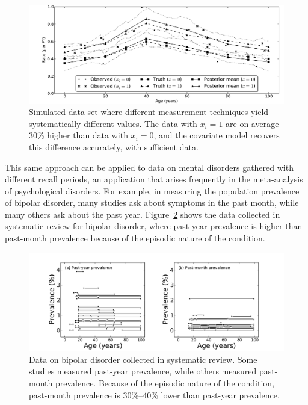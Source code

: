 \begin{figure}[h]
\begin{center}
\includegraphics[width=\textwidth]{cov_fe.pdf}
\caption[Simulated data set where different measurement techniques
  yield systematically different values.]{Simulated data set where 
  different measurement techniques
  yield systematically different values. The data with $x_i=1$ are on
  average 30\% higher than data with $x_i=0$, and the covariate model
  recovers this difference accurately, with sufficient data.}
\label{cov-sim}
\end{center}
\end{figure}

This same approach can be applied to data on mental disorders
gathered with different recall periods, an application that arises
frequently in the meta-analysis of psychological disorders.  For
example, in measuring the population prevalence of bipolar disorder,
many studies ask about symptoms in the past month,
while many others ask about the past year.
Figure~\ref{bipolar-data-cv} shows the data collected in systematic
review for bipolar disorder, where past-year prevalence is higher than
past-month prevalence because of the episodic nature of the
condition.

\begin{figure}[h]
\begin{center}
\includegraphics[width=\textwidth]{bipolar-data-by-cv.pdf}
\caption[Data on bipolar disorder collected in systematic review.]{Data 
  on bipolar disorder collected in systematic review.
  Some studies measured past-year prevalence, while others measured
  past-month prevalence.  Because of the episodic nature of the
  condition, past-month prevalence is $30\%$--$40\%$ lower than past-year prevalence.}
\label{bipolar-data-cv}
\end{center}
\end{figure}


